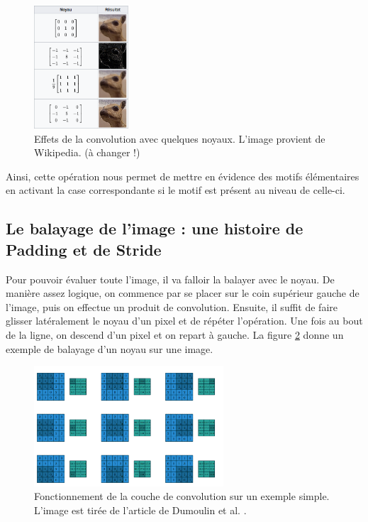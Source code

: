 \begin{figure}[!h]
\centering
\includegraphics[width=100pt]{images/cnn/chien_prairie.png} 
\caption{Effets de la convolution avec quelques noyaux. L'image provient de Wikipedia. (à changer !)}
\label{chien_prairie}
\end{figure}

Ainsi, cette opération nous permet de mettre en évidence des motifs élémentaires en activant la case correspondante si le motif est présent au niveau de celle-ci.

\subsection{Le balayage de l'image : une histoire de Padding et de Stride}

Pour pouvoir évaluer toute l'image, il va falloir la balayer avec le noyau. De manière assez logique, on commence par se placer sur le coin supérieur gauche de l'image, puis on effectue un produit de convolution. Ensuite, il suffit de faire glisser latéralement le noyau d'un pixel et de répéter l'opération. Une fois au bout de la ligne, on descend d'un pixel et on repart à gauche. La figure \ref{convolution} donne un exemple de balayage d'un noyau sur une image.

\begin{figure}[!h]
\centering
\includegraphics[width=200pt]{images/cnn/convolution.png}
\caption{Fonctionnement de la couche de convolution sur un exemple simple. L'image est tirée de l'article de Dumoulin et al. \cite{dumoulin_guide_2018}.}
\label{convolution}
\end{figure}

